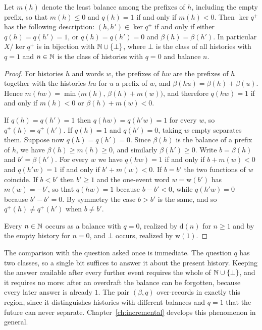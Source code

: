 \begin{newresult}\label{prop:account}
Let $m(h)$ denote the least balance among the prefixes of $h$, including the empty prefix, so that $m(h)\le 0$ and $q(h)=1$ if and only if $m(h)<0$. Then $\ker q^{+}$ has the following description: $(h,h')\in\ker q^{+}$ if and only if either $q(h)=q(h')=1$, or $q(h)=q(h')=0$ and $\beta(h)=\beta(h')$. In particular $X/{\ker q^{+}}$ is in bijection with $\mathbb{N}\cup\{\bot\}$, where $\bot$ is the class of all histories with $q=1$ and $n\in\mathbb{N}$ is the class of histories with $q=0$ and balance $n$.
\end{newresult}
\begin{proof}
For histories $h$ and words $w$, the prefixes of $hw$ are the prefixes of $h$ together with the histories $hu$ for $u$ a prefix of $w$, and $\beta(hu)=\beta(h)+\beta(u)$. Hence $m(hw)=\min\bigl(m(h),\,\beta(h)+m(w)\bigr)$, and therefore $q(hw)=1$ if and only if $m(h)<0$ or $\beta(h)+m(w)<0$.

If $q(h)=q(h')=1$ then $q(hw)=q(h'w)=1$ for every $w$, so $q^{+}(h)=q^{+}(h')$. If $q(h)=1$ and $q(h')=0$, taking $w$ empty separates them. Suppose now $q(h)=q(h')=0$. Since $\beta(h)$ is the balance of a prefix of $h$, we have $\beta(h)\ge m(h)\ge0$, and similarly $\beta(h')\ge0$. Write $b=\beta(h)$ and $b'=\beta(h')$. For every $w$ we have $q(hw)=1$ if and only if $b+m(w)<0$ and $q(h'w)=1$ if and only if $b'+m(w)<0$. If $b=b'$ the two functions of $w$ coincide. If $b<b'$ then $b'\ge1$ and the one-event word $w=\mathrm{w}(b')$ has $m(w)=-b'$, so that $q(hw)=1$ because $b-b'<0$, while $q(h'w)=0$ because $b'-b'=0$. By symmetry the case $b>b'$ is the same, and so $q^{+}(h)\ne q^{+}(h')$ when $b\ne b'$.

Every $n\in\mathbb{N}$ occurs as a balance with $q=0$, realized by $\mathrm{d}(n)$ for $n\ge1$ and by the empty history for $n=0$, and $\bot$ occurs, realized by $\mathrm{w}(1)$.
\end{proof}

The comparison with the question asked once is immediate. The question $q$ has two classes, so a single bit suffices to answer it about the present history. Keeping the answer available after every further event requires the whole of $\mathbb{N}\cup\{\bot\}$, and it requires no more: after an overdraft the balance can be forgotten, because every later answer is already $1$. The pair $(\beta,q)$ over-records in exactly this region, since it distinguishes histories with different balances and $q=1$ that the future can never separate. Chapter~\ref{ch:incremental} develops this phenomenon in general.


